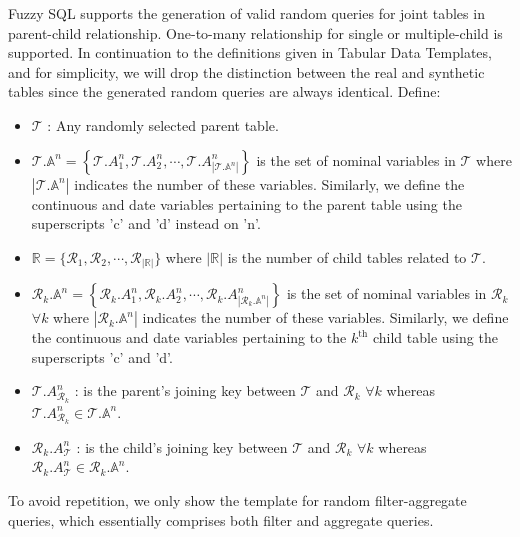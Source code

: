 Fuzzy SQL supports the generation of valid random queries for joint
tables in parent-child relationship. One-to-many relationship for single
or multiple-child is supported. In continuation to the definitions given
in Tabular Data Templates, and for simplicity, we will drop the
distinction between the real and synthetic tables since the generated
random queries are always identical. Define:

\begin{itemize}
\item
  \(\mathcal{T}\) : Any randomly selected parent table.
\item
  \(\mathcal{T}.\mathbb{A}^{n} = \left\{ \mathcal{T}.A_{1}^{n},\mathcal{T}.A_{2}^{n},\cdots,\mathcal{T}.A_{\left| \mathcal{T}.\mathbb{A}^{n} \right|}^{n} \right\}\)
  is the set of nominal variables in \(\mathcal{T}\) where
  \(\left| \mathcal{T}.\mathbb{A}^{n} \right|\) indicates the number of
  these variables. Similarly, we define the continuous and date
  variables pertaining to the parent table using the superscripts 'c'
  and 'd' instead on 'n'.
\item
  \(\mathbb{R} = \{\mathcal{R}_{1},\mathcal{R}_{2},\cdots,\mathcal{R}_{|\mathbb{R}|}\}\)
  where \(|\mathbb{R}|\) is the number of child tables related to
  \(\mathcal{T}\).
\item
  \(\mathcal{R}_{k}.\mathbb{A}^{n} = \left\{ \mathcal{R}_{k}.A_{1}^{n},\mathcal{R}_{k}.A_{2}^{n},\cdots,\mathcal{R}_{k}.A_{\left| \mathcal{R}_{k}.\mathbb{A}^{n} \right|}^{n} \right\}\)
  is the set of nominal variables in \(\mathcal{R}_{k}\) \(\forall k\)
  where \(\left| \mathcal{R}_{k}.\mathbb{A}^{n} \right|\) indicates the
  number of these variables. Similarly, we define the continuous and
  date variables pertaining to the \(k^{\text{th}}\) child table using
  the superscripts 'c' and 'd'.
\item
  \(\mathcal{T}.A_{\mathcal{R}_{k}}^{n}\) : is the parent's joining key
  between \(\mathcal{T}\) and \(\mathcal{R}_{k}\) \(\forall k\) whereas
  \(\mathcal{T}.A_{\mathcal{R}_{k}}^{n} \in \mathcal{T}.\mathbb{A}^{n}\).
\item
  \(\mathcal{R}_{k}.A_{\mathcal{T}}^{n}\) : is the child's joining key
  between \(\mathcal{T}\) and \(\mathcal{R}_{k}\) \(\forall k\) whereas
  \(\mathcal{R}_{k}.A_{\mathcal{T}}^{n} \in \mathcal{R}_{k}.\mathbb{A}^{n}\).
\end{itemize}

To avoid repetition, we only show the template for random
filter-aggregate queries, which essentially comprises both filter and
aggregate queries.

